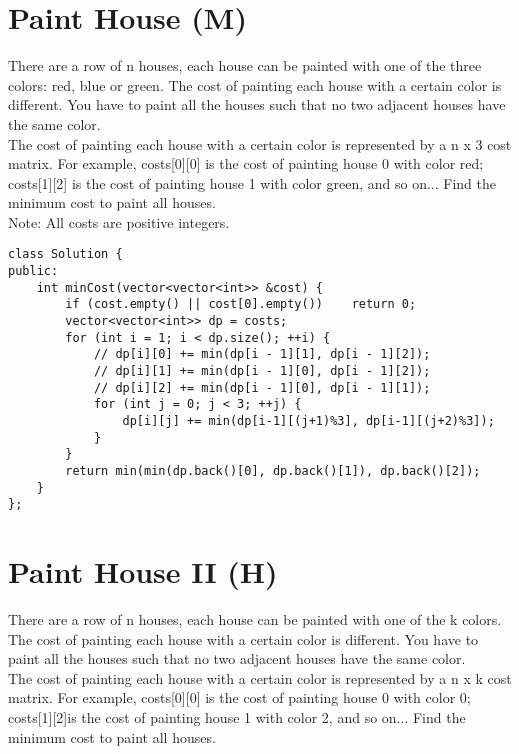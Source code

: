 \section{Paint House (M)}
There are a row of n houses, each house can be painted with one of the three colors: red, blue or green. The cost of painting each house with a certain color is different. You have to paint all the houses such that no two adjacent houses have the same color.\\

The cost of painting each house with a certain color is represented by a n x 3 cost matrix. For example, costs[0][0] is the cost of painting house 0 with color red; costs[1][2] is the cost of painting house 1 with color green, and so on... Find the minimum cost to paint all houses.\\

Note:
All costs are positive integers.\\

\begin{lstlisting}
class Solution {
public:
    int minCost(vector<vector<int>> &cost) {
        if (cost.empty() || cost[0].empty())    return 0;
        vector<vector<int>> dp = costs;
        for (int i = 1; i < dp.size(); ++i) {
            // dp[i][0] += min(dp[i - 1][1], dp[i - 1][2]);
            // dp[i][1] += min(dp[i - 1][0], dp[i - 1][2]);
            // dp[i][2] += min(dp[i - 1][0], dp[i - 1][1]);
            for (int j = 0; j < 3; ++j) {
                dp[i][j] += min(dp[i-1][(j+1)%3], dp[i-1][(j+2)%3]);
            }
        }
        return min(min(dp.back()[0], dp.back()[1]), dp.back()[2]);
    }
};
\end{lstlisting}


\section{Paint House II (H)}
There are a row of n houses, each house can be painted with one of the k colors. The cost of painting each house with a certain color is different. You have to paint all the houses such that no two adjacent houses have the same color.\\

The cost of painting each house with a certain color is represented by a n x k cost matrix. For example, costs[0][0] is the cost of painting house 0 with color 0; costs[1][2]is the cost of painting house 1 with color 2, and so on... Find the minimum cost to paint all houses.\\

